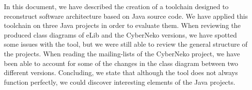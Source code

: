 In this document, we have described the creation of a toolchain designed to reconstruct software architecture based on Java source code. 
We have applied this toolchain on three Java projects in order to evaluate them.
When reviewing the produced class diagrams of eLib and the CyberNeko versions, we have spotted some issues with the tool, but we were still able to review the general structure of the projects.
When reading the mailing-lists of the CyberNeko project, we have been able to account for some of the changes in the class diagram between two different versions.
Concluding, we state that although the tool does not always function perfectly, we could discover interesting elements of the Java projects.

